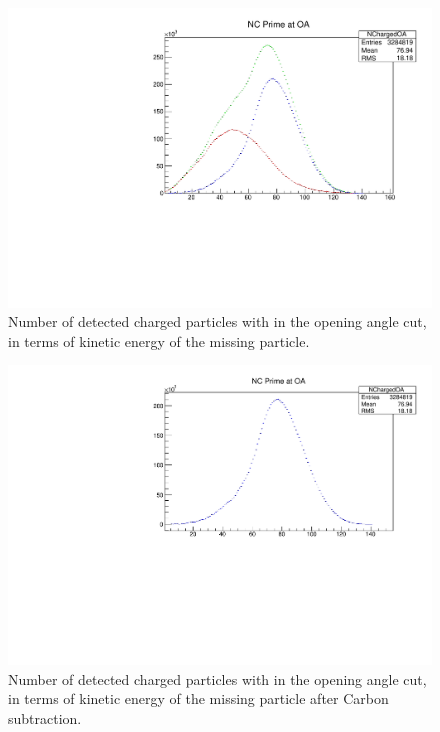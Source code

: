 \documentclass[a4paper,12pt]{article}
\begin{document}
\begin{figure}
\includegraphics[width=\textwidth]{ncoa_b4.pdf}
\caption{Number of detected charged particles with in the opening angle cut, in terms of kinetic energy of the missing particle. }
\end{figure}

\begin{figure}
\includegraphics[width=\textwidth]{ncoa.pdf}
\caption{Number of detected charged particles with in the opening angle cut, in terms of kinetic energy of the missing particle after Carbon subtraction. }
\end{figure}
\end{document}
